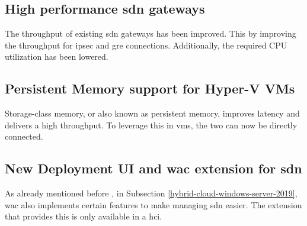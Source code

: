 \subsection*{High performance \acrshort{sdn} gateways}
The throughput of existing \acrshort{sdn} gateways has been improved. This by improving the throughput for \acrfull{ipsec} and \acrfull{gre} connections. Additionally, the required CPU utilization has been lowered.
\subsection*{Persistent Memory support for Hyper-V VMs}
Storage-class memory, or also known as persistent memory, improves latency and delivers a high throughput. To leverage this in \acrshort{vm}s, the two can now be directly connected.
\subsection*{New Deployment UI and \acrlong{wac} extension for \acrshort{sdn}}
As already mentioned before , in Subsection \ref{hybrid-cloud-windows-server-2019}, \acrlong{wac} also implements certain features to make managing \acrshort{sdn} easier. The extension that provides this is only available in a \acrshort{hci}.

\clearpage

